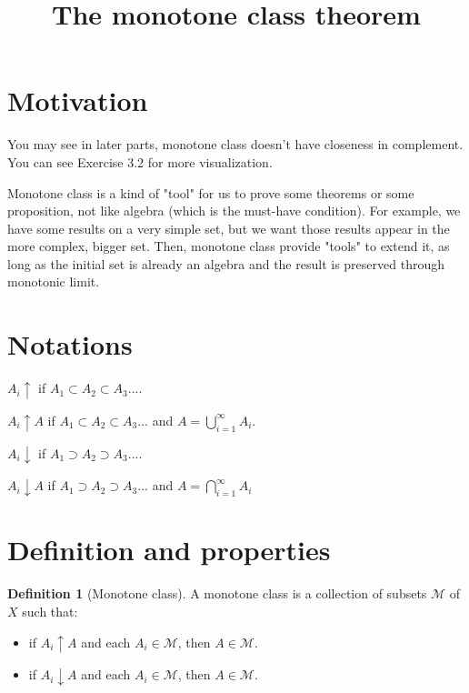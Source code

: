 \documentclass[11pt,a4paper]{article}
\title{\textbf{The monotone class theorem}}
\theoremstyle{definition}
\newtheorem{definition}{Definition}[section]
\theoremstyle{plain}
\begin{document}
\maketitle
\tableofcontents
\newpage

\section{Motivation}

\begin{mynote}
You may see in later parts, monotone class doesn't have closeness in complement. You can see Exercise 3.2 for more visualization.
\end{mynote}

\begin{mynote}
Monotone class is a kind of "tool" for us to prove some theorems or some proposition, not like algebra (which is the must-have condition). For example, we have some results on a very simple set, but we want those results appear in the more complex, bigger set. Then, monotone class provide "tools" to extend it, as long as the initial set is already an algebra and the result is preserved through monotonic limit.
\end{mynote}

\section{Notations}
$A_i\uparrow$ if $A_1 \subset A_2 \subset A_3 ...$.

$A_i \uparrow A$ if $A_1 \subset A_2 \subset A_3 ...$ and $A = \bigcup_{i=1}^{\infty}A_i$.

$A_i \downarrow$ if $A_1 \supset A_2 \supset A_3 ...$.

$A_i \downarrow A$ if $A_1 \supset A_2 \supset A_3 ...$ and $A = \bigcap_{i=1}^{\infty}A_i$

\section{Definition and properties}
\begin{definition}[Monotone class]
A monotone class is a collection of subsets $\mathcal{M}$ of $X$ such that:
\begin{itemize}
    \item if $A_i \uparrow A$ and each $A_i \in \mathcal{M}$, then $A \in \mathcal{M}$.
    \item if $A_i \downarrow A$ and each $A_i \in \mathcal{M}$, then $A \in \mathcal{M}$.
\end{itemize}
\end{definition}
\end{document}
